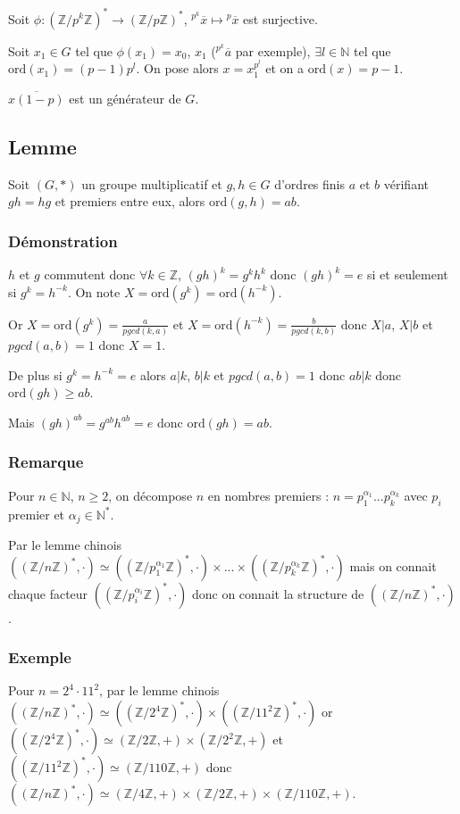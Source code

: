 \documentclass[a4paper,10pt]{book} %
\newcommand{\N}{\mathbb{N}}
\newcommand{\Z}{\mathbb{Z}}
\newcommand{\ord}{\mathrm{ord}}
\begin{document}
Soit $\phi : (\Z/p^k\Z)^*\rightarrow (\Z/p\Z)^*$, ${}^{p^k}\overline{x} \mapsto {}^p\overline{x}$ est surjective.

Soit $x_1\in G$ tel que $\phi(x_1)=x_0$, $x_1$ (${}^{p^k}\overline{a}$ par exemple), $\exists l\in \N$ tel que $\ord(x_1)=(p-1)p^l$. On pose alors $x=x_1^{p^l}$ et on a $\ord(x)=p-1$.

$\overline{x(1-p)}$ est un générateur de $G$.

\newpage

\subsection{Lemme}
Soit $(G,*)$ un groupe multiplicatif et $g,h\in G$ d'ordres finis $a$ et $b$ vérifiant $gh=hg$ et premiers entre eux, alors $\ord(g,h)=ab$.

\subsubsection{Démonstration}
$h$ et $g$ commutent donc $\forall k\in \Z$, $(gh)^k=g^kh^k$ donc $(gh)^k=e$ si et seulement si $g^k=h^{-k}$. On note $X=\ord(g^k)=\ord(h^{-k})$.

Or $X=\ord(g^k)=\frac{a}{pgcd(k,a)}$ et $X=\ord(h^{-k})=\frac{b}{pgcd(k,b)}$ donc $X|a$, $X|b$ et $pgcd(a,b)=1$ donc $X=1$.

De plus si $g^k=h^{-k}=e$ alors $a|k$, $b|k$ et $pgcd(a,b)=1$ donc $ab|k$ donc $\ord(gh)\geq ab$.

Mais $(gh)^{ab}=g^{ab}h^{ab}=e$ donc $\ord(gh)=ab$.

\subsubsection{Remarque}
Pour $n\in \N$, $n\geq 2$, on décompose $n$ en nombres premiers : $n=p_1^{\alpha_1}...p_k^{\alpha_k}$ avec $p_i$ premier et $\alpha_j\in \N^*$.

Par le lemme chinois $((\Z/n\Z)^*,\cdot)\simeq ((\Z/p_1^{\alpha_1}\Z)^*,\cdot)\times ...\times ((\Z/p_k^{\alpha_k}\Z)^*,\cdot)$ mais on connait chaque facteur $((\Z/p_i^{\alpha_i}\Z)^*,\cdot)$ donc on connait la structure de $((\Z/n\Z)^*,\cdot)$.

\subsubsection{Exemple}
Pour $n=2^4\cdot 11^2$, par le lemme chinois $((\Z/n\Z)^*,\cdot)\simeq ((\Z/2^4\Z)^*,\cdot)\times((\Z/11^2\Z)^*,\cdot)$ or $((\Z/2^4\Z)^*,\cdot)\simeq(\Z/2\Z,+)\times (\Z/2^2\Z,+)$ et $((\Z/11^2\Z)^*,\cdot)\simeq (\Z/110\Z,+)$ donc $((\Z/n\Z)^*,\cdot)\simeq (\Z/4\Z,+)\times (\Z/2\Z,+)\times (\Z/110\Z,+)$.
\end{document}
